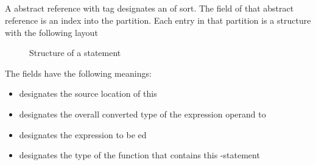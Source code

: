 
\subsection{}
\label{sec:ifc:StmtSort:Return}

A  abstract reference with tag  designates an  of  sort.
The  field of that abstract reference is an index into the  partition.
Each entry in that partition is a structure with the following layout
%
\begin{figure}[H]
	\centering
	\caption{Structure of a  statement}
	\label{fig:ifc-return-stmt-structure}
\end{figure}
%
The fields have the following meanings:
\begin{itemize}
	\item {} designates the source location of this 
	\item {} designates the overall converted type of the expression operand to 
	\item {} designates the expression to be ed
	\item {} designates the type of the function that contains this -statement
\end{itemize}



\subsection{}
\label{sec:ifc:StmtSort:Decl}

